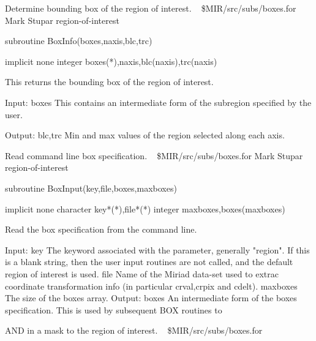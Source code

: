 %
\noindent Determine bounding box of the region of interest.
\newline \ 
\newline {} \$MIR/src/subs/boxes.for
\newline {} Mark Stupar
\newline {} region-of-interest
\par{\tenpoint
{\eightpoint\begintt
        subroutine BoxInfo(boxes,naxis,blc,trc)

        implicit none
        integer boxes(*),naxis,blc(naxis),trc(naxis)

  This returns the bounding box of the region of interest.

  Input:
    boxes      This contains an intermediate form of the subregion
               specified by the user.

  Output:
    blc,trc    Min and max values of the region selected along each axis.
\endtt}
\par}
%
\noindent Read command line box specification.
\newline \ 
\newline {} \$MIR/src/subs/boxes.for
\newline {} Mark Stupar
\newline \abox{Keywords:} region-of-interest
\par{\tenpoint
{\eightpoint\begintt
        subroutine BoxInput(key,file,boxes,maxboxes)

        implicit none
        character key*(*),file*(*)
        integer maxboxes,boxes(maxboxes)

  Read the box specification from the command line.

  Input:
    key        The keyword associated with the parameter, generally
               "region". If this is a blank string, then the user
               input routines are not called, and the default region
               of interest is used.
    file       Name of the Miriad data-set used to extrac coordinate
               transformation info (in particular crval,crpix and cdelt).
    maxboxes   The size of the boxes array.
  Output:
    boxes      An intermediate form of the boxes specification. This is
               used by subsequent BOX routines to
\endtt}
\par}
%
\noindent AND in a mask to the region of interest.
\newline \ 
\newline {} \$MIR/src/subs/boxes.for
